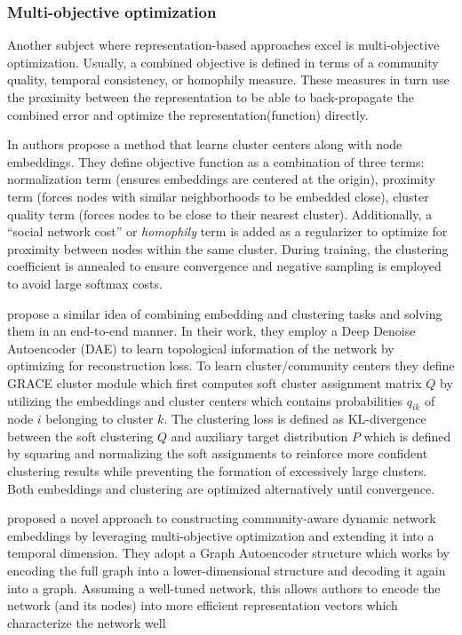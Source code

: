 \documentclass[
acmsmall,
nonacm,
screen,
acmthm]{../../scripts/pandoc/templates/acmart}
\begin{document}
\hypertarget{multi-objective-optimization}{%
\subsubsection{Multi-objective
optimization}\label{multi-objective-optimization}}

Another subject where representation-based approaches excel is
multi-objective optimization. Usually, a combined objective is defined
in terms of a community quality, temporal consistency, or homophily
measure. These measures in turn use the proximity between the
representation to be able to back-propagate the combined error and
optimize the representation(function) directly.

In \citet{rozemberczkiGEMSECGraphEmbedding2019} authors propose a method
that learns cluster centers along with node embeddings. They define
objective function as a combination of three terms: normalization term
(ensures embeddings are centered at the origin), proximity term (forces
nodes with similar neighborhoods to be embedded close), cluster quality
term (forces nodes to be close to their nearest cluster). Additionally,
a ``social network cost'' or \emph{homophily} term is added as a
regularizer to optimize for proximity between nodes within the same
cluster. During training, the clustering coefficient is annealed to
ensure convergence and negative sampling is employed to avoid large
softmax costs.

\citet{yangGraphClusteringDynamic2017} propose a similar idea of
combining embedding and clustering tasks and solving them in an
end-to-end manner. In their work, they employ a Deep Denoise Autoencoder
(DAE) to learn topological information of the network by optimizing for
reconstruction loss. To learn cluster/community centers they define
GRACE cluster module which first computes soft cluster assignment matrix
\(Q\) by utilizing the embeddings and cluster centers which contains
probabilities \(q_{ik}\) of node \(i\) belonging to cluster \(k\). The
clustering loss is defined as KL-divergence between the soft clustering
\(Q\) and auxiliary target distribution \(P\) which is defined by
squaring and normalizing the soft assignments to reinforce more
confident clustering results while preventing the formation of
excessively large clusters. Both embeddings and clustering are optimized
alternatively until convergence.

\citet{maCommunityawareDynamicNetwork2020} proposed a novel approach to
constructing community-aware dynamic network embeddings by leveraging
multi-objective optimization and extending it into a temporal dimension.
They adopt a Graph Autoencoder structure which works by encoding the
full graph into a lower-dimensional structure and decoding it again into
a graph. Assuming a well-tuned network, this allows authors to encode
the network (and its nodes) into more efficient representation vectors
which characterize the network well
\end{document}
